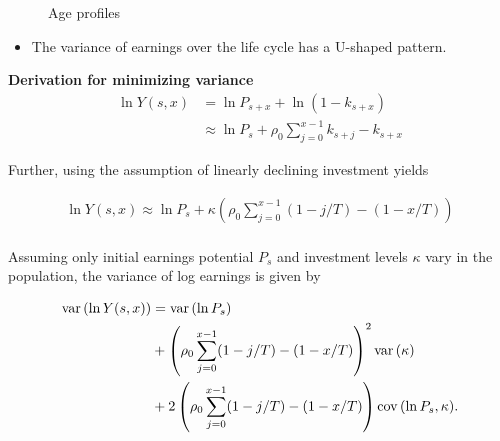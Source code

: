 \begin{frame}
\begin{figure}[htp]\centering
\caption{Age profiles}
\end{figure}
\end{frame}
\begin{frame}
\begin{itemize}
\item The variance of earnings over the life cycle has a U-shaped pattern.
\end{itemize}
\end{frame}
\begin{frame}\textbf{Derivation for minimizing variance}\vspace{0.3cm}
	\begin{align*}
	\ln{Y(s,x)} & = \ln{P_{s+x}} + \ln{(1 - k_{s+x})} \\
	& \approx \ln{P_s} + \rho_0 \sum^{x - 1}_{j=0} k_{s+j} - k_{s+x}
	\end{align*}

	Further, using the assumption of linearly declining investment yields

	\begin{align*}
	\ln{Y(s,x)} \approx \ln{P_s} + \kappa \left(\rho_0 \sum^{x - 1}_{j=0} (1 - j/T) - (1 - x/T)\right) \\
	\end{align*}
\end{frame}
\begin{frame}
	Assuming only initial earnings potential $P_s$ and investment levels $\kappa$ vary in the population, the variance of log earnings is given by

	\begin{align*}
	\mathrm{var}\thinspace(\ln{Y(s,x)}) & = \mathrm{var}\thinspace(\ln{P_s}) \\
	& + \left(\rho_0 \sum^{x - 1}_{j=0} (1 - j/T) - (1 - x/T)\right)^2 \mathrm{var}\thinspace(\kappa) \\
	& + 2\left(\rho_0 \sum^{x - 1}_{j=0} (1 - j/T) - (1 - x/T)\right) \mathrm{cov}\thinspace(\ln{P_s},\kappa).
	\end{align*}
\end{frame}

